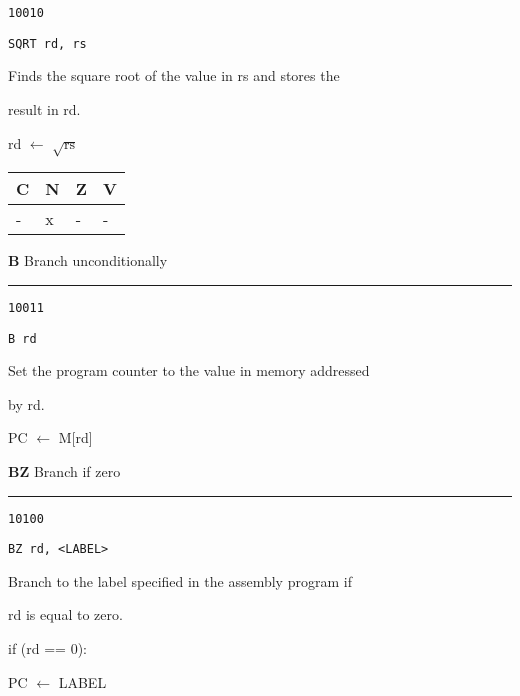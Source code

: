 \documentclass{article}
\begin{document}
{\large
	 \texttt{10010} \par
	\smallbreak
	 \texttt{SQRT rd, rs} \par
	\smallbreak
	 Finds the square root of the value in rs and stores the\par
	\makebox[3.5cm][l]{  } result in rd. \par
	\smallbreak
	 rd $\leftarrow$ $\sqrt{\textrm{rs}}$ \par
	\smallbreak
	 \begin{tabular}{llll} C \quad & N \quad & Z \quad & V \\ \hline - & x & - & - \\ \end{tabular}
}

\bigskip\bigskip

\flushleft
\LARGE\textbf{B} \large \hfill Branch unconditionally

\kern-3pt
\noindent\rule{16.5cm}{0.4pt}
\normalsize

{\large
	 \texttt{10011} \par
	\smallbreak
	 \texttt{B rd} \par
	\smallbreak
	 Set the program counter to the value in memory addressed  \par
	\makebox[3.5cm][l]{  } by rd. \par
	\smallbreak
	 PC $\leftarrow$ M[rd] \par
}

\bigskip\bigskip

\flushleft
\LARGE\textbf{BZ} \large \hfill Branch if zero

\kern-3pt
\noindent\rule{16.5cm}{0.4pt}
\normalsize

{\large
	 \texttt{10100} \par
	\smallbreak
	 \texttt{BZ rd, <LABEL>} \par
	\smallbreak
	 Branch to the label specified in the assembly program if  \par
	\makebox[3.5cm][l]{  } rd is equal to zero. \par
	\smallbreak
	 if (rd == 0): \par
	\makebox[4cm][l]{  } PC $\leftarrow$ LABEL \par
}
\end{document}
